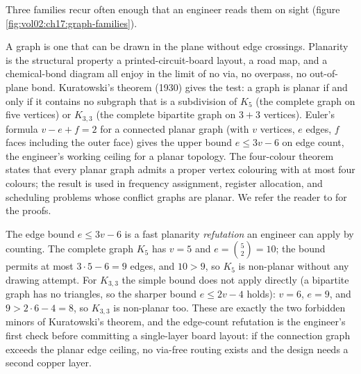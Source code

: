 Three families recur often enough that an engineer reads them on
sight (figure \ref{fig:vol02:ch17:graph-families}).



A  graph is one that can be drawn in the plane
without edge crossings. Planarity is the structural property a
printed-circuit-board layout, a road map, and a chemical-bond
diagram all enjoy in the limit of no via, no overpass, no
out-of-plane bond. Kuratowski's theorem (1930) gives the test: a
graph is planar if and only if it contains no subgraph that is a
subdivision of $K_{5}$ (the complete graph on five vertices) or
$K_{3,3}$ (the complete bipartite graph on $3 + 3$ vertices).
Euler's formula $v - e + f = 2$ for a connected planar graph (with
$v$ vertices, $e$ edges, $f$ faces including the outer face) gives
the upper bound $e \leq 3v - 6$ on edge count, the engineer's
working ceiling for a planar topology. The four-colour theorem
states that every planar graph admits a proper vertex colouring
with at most four colours; the result is used in frequency
assignment, register allocation, and scheduling problems whose
conflict graphs are planar. We refer the reader to
\cite{text:v2ch17-bondy-murty} for the proofs.

The edge bound $e \leq 3v - 6$ is a fast planarity \emph{refutation}
an engineer can apply by counting. The complete graph $K_{5}$ has $v
= 5$ and $e = \binom{5}{2} = 10$; the bound permits at most $3 \cdot
5 - 6 = 9$ edges, and $10 > 9$, so $K_{5}$ is non-planar without any
drawing attempt. For $K_{3,3}$ the simple bound does not apply
directly (a bipartite graph has no triangles, so the sharper bound
$e \leq 2v - 4$ holds): $v = 6$, $e = 9$, and $9 > 2 \cdot 6 - 4 =
8$, so $K_{3,3}$ is non-planar too. These are exactly the two
forbidden minors of Kuratowski's theorem, and the edge-count
refutation is the engineer's first check before committing a
single-layer board layout: if the connection graph exceeds the
planar edge ceiling, no via-free routing exists and the design needs
a second copper layer.

